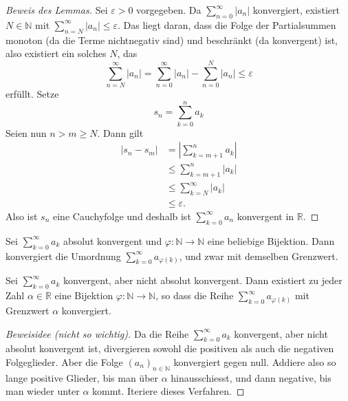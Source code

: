 \documentclass[../main.tex]{subfiles}
\begin{document}
\begin{proof}[Beweis des Lemmas]
  Sei $\varepsilon > 0$ vorgegeben. Da
  $\sum_{n=0}^{\infty} |a_n|$ 
  konvergiert, existiert $N \in \mathbb{N}$ mit
  $\sum_{n=N}^{\infty} |a_n| \leq \varepsilon$.
  Das liegt daran, dass die Folge der
  Partialsummen monoton (da die Terme nichtnegativ sind)
  und beschränkt (da konvergent) ist,
  also existiert ein solches $N$, das
  \[
    \sum_{n=N}^{\infty} |a_n| = \sum_{n=0}^{\infty} |a_n|
    - \sum_{n=0}^{N} |a_n| \leq \varepsilon
  \]
  erfüllt. Setze 
  \[
    s_n = \sum_{k=0}^{n} a_k
  \]
  Seien  nun $n > m \geq N$. Dann gilt
  \begin{align*}
    |s_n - s_m| & = \left| \sum_{k=m+1}^{n} a_k \right|\\
                & \leq \sum_{k=m+1}^{n} |a_k| \\
                & \leq \sum_{k=N}^{\infty} |a_k| \\
                & \leq \varepsilon.
  \end{align*}
  Also ist $s_n$ eine 
  Cauchyfolge und deshalb ist $\sum_{k=0}^{\infty} a_n$ konvergent
  in $\mathbb{R}$.
\end{proof}

\begin{theorem}\label{thm:umordnung}
  Sei $\sum_{k=0}^{\infty} a_k$ absolut konvergent
  und $\varphi \colon \mathbb{N} \to \mathbb{N}$ eine
  beliebige Bijektion.
  Dann konvergiert die
  Umordnung
  $\sum_{k=0}^{\infty} a_{\varphi(k)}$, und
  zwar mit demselben Grenzwert.
\end{theorem}


\begin{zusatz}
  Sei $\sum_{k=0}^{\infty} a_k$ konvergent,
  aber nicht absolut konvergent.
  Dann existiert zu jeder Zahl
  $\alpha \in \mathbb{R}$ eine
  Bijektion $\varphi \colon \mathbb{N} \to \mathbb{N}$,
  so dass die Reihe $\sum_{k=0}^{\infty} a_{\varphi(k)}$ 
  mit Grenzwert $\alpha$ konvergiert.
\end{zusatz}

\begin{proof}[Beweisidee (nicht so wichtig)]
  Da die Reihe $\sum_{k=0}^{\infty} a_k$ konvergent,
  aber nicht absolut konvergent ist,
  divergieren sowohl die positiven als auch die negativen
  Folgeglieder. Aber die Folge ${(a_{n})}_{n \in \mathbb{N}}$
  konvergiert gegen null. Addiere also so lange
  positive Glieder, bis man über $\alpha$ hinausschiesst,
  und dann negative, bis man wieder unter $\alpha$ kommt.
  Iteriere dieses Verfahren.
\end{proof}
\end{document}

